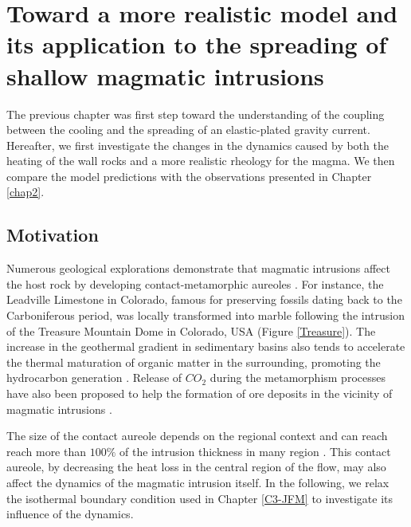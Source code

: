 
\chapter{Toward  a more  realistic model  and its  application to  the
  spreading of shallow magmatic intrusions}
\label{Heating}

\minitoc

The previous  chapter was first  step toward the understanding  of the
coupling between  the cooling and  the spreading of  an elastic-plated
gravity current.  Hereafter,  we first investigate the  changes in the
dynamics  caused by  both the  heating of  the wall  rocks and  a more
realistic  rheology  for   the  magma.  We  then   compare  the  model
predictions with the observations presented in Chapter \ref{chap2}.


\section{Motivation}
\label{sec:introduction}

Numerous geological explorations  demonstrate that magmatic intrusions
affect  the  host  rock  by  developing  contact-metamorphic  aureoles
\citep{Jaeger:1959du,Galushkin:1997dy,Senger:2014tt}.   For  instance,
the  Leadville Limestone  in Colorado,  famous for  preserving fossils
dating back to the Carboniferous  period, was locally transformed into
marble  following  the intrusion  of  the  Treasure Mountain  Dome  in
Colorado, USA (Figure \ref{Treasure}).  The increase in the geothermal
gradient in  sedimentary basins also  tends to accelerate  the thermal
maturation  of  organic  matter  in  the  surrounding,  promoting  the
hydrocarbon  generation  \citep{Senger:2014tt}.    Release  of  $CO_2$
during the metamorphism processes have  also been proposed to help the
formation  of ore  deposits  in the  vicinity  of magmatic  intrusions
\citep{SILLITOE:1998bs,Ganino:2008ft,Zhou:2008hc}.

The size  of the contact aureole  depends on the regional  context and
can reach reach  more than $100\%$ of the intrusion  thickness in many
region \citep{Galushkin:1997dy}.  This  contact aureole, by decreasing
the heat loss in  the central region of the flow,  may also affect the
dynamics of the magmatic intrusion itself.  In the following, we relax
the  isothermal boundary  condition  used in  Chapter \ref{C3-JFM}  to
investigate its influence of the dynamics.

